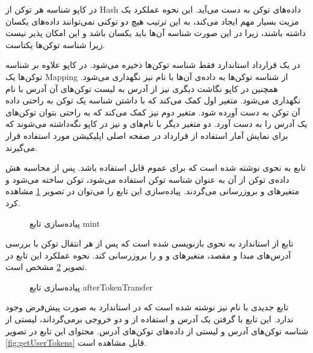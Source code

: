 در کاپو شناسه هر توکن از
\gls{Hash}
داده‌های توکن به دست می‌آید.
این نحوه عملکرد یک مزیت بسیار مهم ایجاد می‌کند،
به این ترتیب هیچ دو توکنی نمی‌توانند داده‌های یکسان داشته باشند،
زیرا در این صورت شناسه آن‌ها باید یکسان باشد و این امکان پذیر نیست زیرا شناسه توکن‌ها یکتاست.

در یک قرارداد
استاندارد فقط شناسه توکن‌ها ذخیره می‌شود. در کاپو علاوه بر شناسه توکن‌ها یک
\gls{Mapping}
از شناسه توکن‌ها به داده‌ی آن‌ها با نام
نیز نگهداری می‌شود. همچنین در کاپو نگاشت دیگری نیز از آدرس به لیست توکن‌های آن آدرس با نام
نگهداری می‌شود.
متغیر اول کمک می‌کند که با داشتن شناسه یک توکن به راحتی داده آن توکن به دست آورده شود.
متغیر دوم نیز کمک می‌کند که به راحتی بتوان توکن‌های یک آدرس را به دست آورد. دو متغیر دیگر با نام‌های
و
نیز در کاپو نگه‌داشته می‌شوند که برای نمایش آمار استفاده از قرارداد در صفحه اصلی اپلیکیشن مورد استفاده قرار می‌گیرند.

تابع
به نحوی نوشته شده است که برای عموم قابل استفاده باشد.
پس از محاسبه هش داده‌ی توکن از آن به عنوان شناسه توکن استفاده می‌شود،
توکن ساخته می‌شود و متغیرهای
و
بروزرسانی می‌گردند.
پیاده‌سازی این تابع را می‌توان در تصویر
\ref{fig:mint}
مشاهده کرد.

\begin{figure}
\centerline{}
\caption{پیاده‌سازی تابع mint}
\label{fig:mint}
\end{figure}

تابع
از استاندارد
به نحوی بازنویسی
شده است که پس از هر انتقال توکن با بررسی آدرس‌های مبدا و مقصد، متغیر‌های
و
و
را بروزرسانی کند.
نحوه عملکرد این تابع در تصویر
\ref{fig:afterTokenTransfer}
مشخص است.

\begin{figure}
\centerline{}
\caption{پیاده‌سازی تابع afterTokenTransfer}
\label{fig:afterTokenTransfer}
\end{figure}

تابع جدیدی با نام
نیز نوشته شده است که در استاندارد
به صورت پیش‌فرض وجود ندارد. این تابع با گرفتن یک آدرس و استفاده از
و
دو خروجی برمی‌گرداند، لیستی از شناسه توکن‌های آدرس و لیستی از داده‌های توکن‌های آدرس.
محتوای این تابع در تصویر
\ref{fig:getUserTokens}
قابل مشاهده است.

